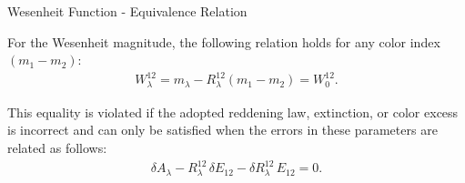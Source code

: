 
\begin{notebox}[sharp corners, width=\textwidth]{Wesenheit Function - Equivalence Relation}

For the Wesenheit magnitude, the following relation holds for any color index $(m_1 - m_2)$:
\begin{align}
W_\lambda^{12} = m_\lambda - R_\lambda^{12}(m_1 - m_2) = W_0^{12}.
\end{align}

This equality is violated if the adopted reddening law, extinction, or color excess is incorrect and can only be satisfied when the errors in these parameters are related as follows:
\begin{align}
\delta A_\lambda - R_\lambda^{12}\,\delta E_{12} - \delta R_\lambda^{12}\,E_{12} = 0.
\end{align}

\end{notebox}
